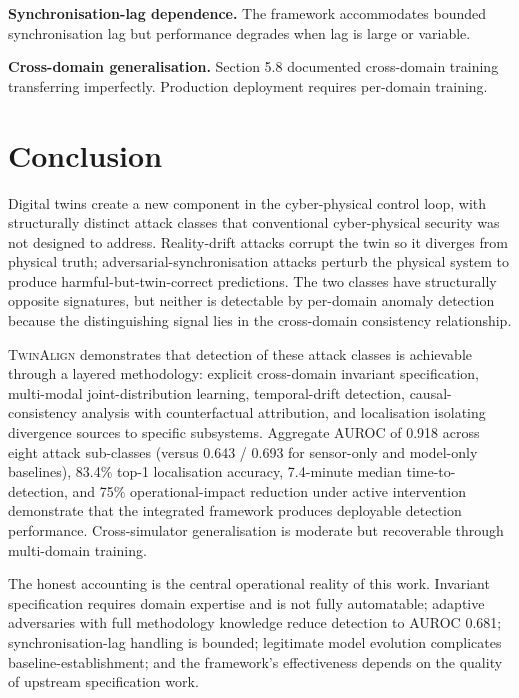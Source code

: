 \documentclass[sigconf,nonacm]{acmart}
\begin{document}
\textbf{Synchronisation-lag dependence.} The framework accommodates
bounded synchronisation lag but performance degrades when lag is
large or variable.

\textbf{Cross-domain generalisation.} Section 5.8 documented
cross-domain training transferring imperfectly. Production
deployment requires per-domain training.

\section{Conclusion}

Digital twins create a new component in the cyber-physical
control loop, with structurally distinct attack classes that
conventional cyber-physical security was not designed to address.
Reality-drift attacks corrupt the twin so it diverges from
physical truth; adversarial-synchronisation attacks perturb the
physical system to produce harmful-but-twin-correct predictions.
The two classes have structurally opposite signatures, but neither
is detectable by per-domain anomaly detection because the
distinguishing signal lies in the cross-domain consistency
relationship.

\textsc{TwinAlign} demonstrates that detection of these attack
classes is achievable through a layered methodology: explicit
cross-domain invariant specification, multi-modal joint-distribution
learning, temporal-drift detection, causal-consistency analysis
with counterfactual attribution, and localisation isolating
divergence sources to specific subsystems. Aggregate AUROC of
0.918 across eight attack sub-classes (versus 0.643 / 0.693 for
sensor-only and model-only baselines), 83.4\% top-1 localisation
accuracy, 7.4-minute median time-to-detection, and 75\%
operational-impact reduction under active intervention demonstrate
that the integrated framework produces deployable detection
performance. Cross-simulator generalisation is moderate but
recoverable through multi-domain training.

The honest accounting is the central operational reality of this
work. Invariant specification requires domain expertise and is
not fully automatable; adaptive adversaries with full methodology
knowledge reduce detection to AUROC 0.681; synchronisation-lag
handling is bounded; legitimate model evolution complicates
baseline-establishment; and the framework's effectiveness depends
on the quality of upstream specification work.
\end{document}
